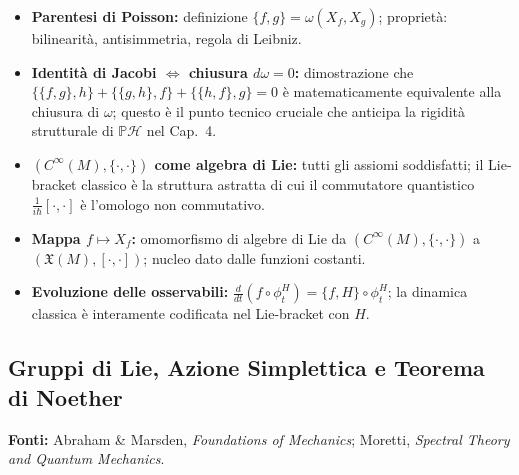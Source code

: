 \documentclass[12pt, a4paper]{article}
\newcommand{\fonti}[1]{%
	\begin{fontebox}
		\textcolor{fontecolor}{\footnotesize\textbf{Fonti:} #1}
	\end{fontebox}%
}
\begin{document}
	\begin{itemize}
		\item \textbf{Parentesi di Poisson:} definizione $\{f, g\} = \omega(X_f, X_g)$;
		proprietà: bilinearità, antisimmetria, regola di Leibniz.
		\item \textbf{Identità di Jacobi $\Leftrightarrow$ chiusura $d\omega = 0$:}
		dimostrazione che $\{\{f,g\},h\} + \{\{g,h\},f\} + \{\{h,f\},g\} = 0$ è
		matematicamente equivalente alla chiusura di $\omega$; questo è il punto tecnico
		cruciale che anticipa la rigidità strutturale di $\mathbb{P}\mathcal{H}$ nel Cap.\ 4.
		\item \textbf{$(C^\infty(M), \{\cdot,\cdot\})$ come algebra di Lie:} tutti gli assiomi
		soddisfatti; il Lie-bracket classico è la struttura astratta di cui il commutatore
		quantistico $\frac{1}{i\hbar}[\cdot,\cdot]$ è l'omologo non commutativo.
		\item \textbf{Mappa $f \mapsto X_f$:} omomorfismo di algebre di Lie da
		$(C^\infty(M), \{\cdot,\cdot\})$ a $(\mathfrak{X}(M), [\cdot,\cdot])$; nucleo
		dato dalle funzioni costanti.
		\item \textbf{Evoluzione delle osservabili:} $\frac{d}{dt}(f \circ \phi_t^H) =
		\{f, H\} \circ \phi_t^H$; la dinamica classica è interamente codificata nel
		Lie-bracket con $H$.
	\end{itemize}
	
	\subsection{Gruppi di Lie, Azione Simplettica e Teorema di Noether}
	
	\fonti{Abraham \& Marsden, \textit{Foundations of Mechanics}; Moretti,
		\textit{Spectral Theory and Quantum Mechanics}.}
	
\end{document}
